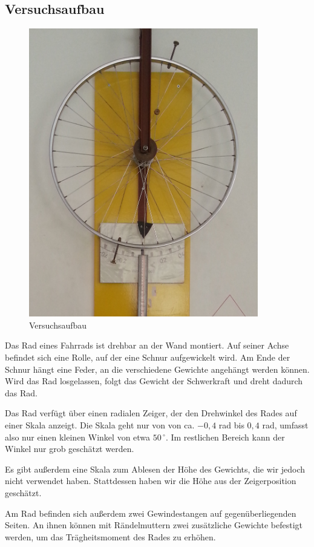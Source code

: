 \documentclass[a4paper,german,12pt,smallheadings]{scrartcl}
\begin{document}
\subsection{Versuchsaufbau}
\begin{figure}
  \includegraphics[width=10cm]{fig1.jpg}
  \caption{Versuchsaufbau}
\end{figure}
Das Rad eines Fahrrads ist drehbar an der Wand montiert. Auf seiner Achse
befindet sich eine Rolle, auf der eine Schnur aufgewickelt wird. Am Ende der
Schnur hängt eine Feder, an die verschiedene Gewichte angehängt werden können.
Wird das Rad losgelassen, folgt das Gewicht der Schwerkraft und dreht dadurch
das Rad.

Das Rad verfügt über einen radialen Zeiger, der den Drehwinkel des Rades auf
einer Skala anzeigt. Die Skala geht nur von von ca. $-0{,}4$ rad bis $0{,}4$
rad, umfasst also nur einen kleinen Winkel von etwa $50\,^\circ$.  Im
restlichen Bereich kann der Winkel nur grob geschätzt werden.

Es gibt außerdem eine Skala zum Ablesen der Höhe des Gewichts, die wir jedoch
nicht verwendet haben. Stattdessen haben wir die Höhe aus der
Zeigerposition geschätzt.

Am Rad befinden sich außerdem zwei Gewindestangen auf gegenüberliegenden
Seiten. An ihnen können mit Rändelmuttern zwei zusätzliche Gewichte befestigt
werden, um das Trägheitsmoment des Rades zu erhöhen.
\end{document}
